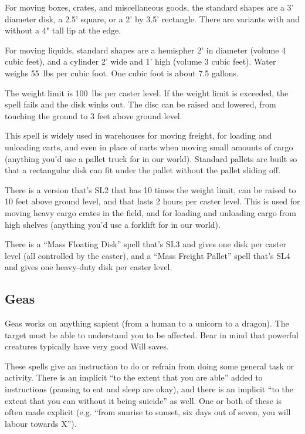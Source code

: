 For moving boxes, crates, and miscellaneous goods, the standard shapes are
a 3' diameter disk, a 2.5' square, or a 2' by 3.5' rectangle. There are
variants with and without a 4" tall lip at the edge.

For moving liquids, standard shapes are a hemispher 2' in diameter (volume
4 cubic feet), and a cylinder 2' wide and 1' high (volume 3 cubic feet).
Water weighs 55~lbs per cubic foot. One cubic foot is about 7.5 gallons.

The weight limit is 100~lbs per caster level. If the weight limit is
exceeded, the spell fails and the disk winks out. The disc can be raised and
lowered, from touching the ground to 3 feet above ground level.

This spell is widely used in warehouses for moving freight, for loading and
unloading carts, and even in place of carts when moving small amounts of
cargo (anything you'd use a pallet truck for in our world). Standard pallets
are built so that a rectangular disk can fit under the pallet without the
pallet sliding off.

There is a version that's SL2 that has 10 times the weight limit, can be
raised to 10 feet above ground level, and that lasts 2 hours per caster
level. This is used for moving heavy cargo crates in the field, and for
loading and unloading cargo from high shelves (anything you'd use a forklift
for in our world).

There is a ``Mass Floating Disk'' spell that's SL3 and gives one disk per
caster level (all controlled by the caster), and a ``Mass Freight Pallet''
spell that's SL4 and gives one heavy-duty disk per caster level.
%

%
\subsection{Geas}

Geas works on anything sapient (from a human to a unicorn to a dragon).
The target must be able to understand you to be affected. Bear in mind that
powerful creatures typically have very good Will saves.

These spells give an instruction to do or refrain from doing some general
task or activity. There is an implicit ``to the extent that you are able''
added to instructions (pausing to eat and sleep are okay), and there is an
implicit ``to the extent that you can without it being suicide'' as well.
One or both of these is often made explicit (e.g. ``from sunrise to sunset,
six days out of seven, you will labour towards X'').

